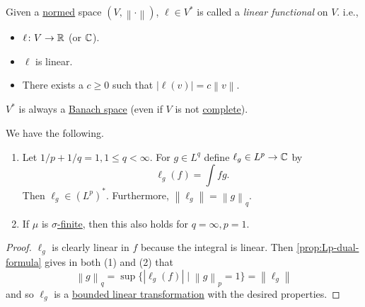 \begin{definition}\label{def:linear-functional}
	Given a \hyperref[def:norm]{normed} space \((V, \left\lVert \cdot\right\rVert )\), \(\ell \in V^\ast\) is called a \emph{linear functional} on \(V\). i.e.,
	\begin{itemize}
		\item \(\ell \colon V \to \mathbb{\MakeUppercase{r}}\) (or \(\mathbb{\MakeUppercase{c}} \)).
		\item \(\ell \) is linear.
		\item There exists a \(c \geq 0\) such that \(\left\vert \ell(v) \right\vert  = c\left\lVert v\right\rVert\).
	\end{itemize}
\end{definition}

\begin{note}
	\(V^\ast\) is always a \hyperref[def:Banach-space]{Banach space} (even if \(V\) is not \hyperref[def:complete]{complete}).
\end{note}

\begin{corollary}\label{col:lp-lq-isometric}
	We have the following.
	\begin{enumerate}[(1)]
		\item Let \(1/p + 1/q = 1, 1 \leq q < \infty\). For \(g \in L^q\) define \(\ell_g \in L^p \to \mathbb{\MakeUppercase{c}}\) by
		      \[
			      \ell_g(f) = \int fg.
		      \]
		      Then \(\ell_g \in (L^p)^\ast\). Furthermore, \(\left\lVert \ell_g\right\rVert = \left\lVert g\right\rVert_q\).
		\item If \(\mu\) is \hyperref[def:finite-measure]{\(\sigma \)-finite}, then this also holds for \(q = \infty, p = 1\).
	\end{enumerate}
\end{corollary}
\begin{proof}
	\(\ell_g\) is clearly linear in \(f\) because the integral is linear. Then \autoref{prop:Lp-dual-formula} gives in both (1) and (2) that
	\[
		\left\lVert g\right\rVert_q = \sup\{\left\vert \ell_g(f) \right\vert  \mid \left\lVert g\right\rVert _p = 1 \} = \left\lVert \ell_g\right\rVert
	\]
	and so \(\ell_g\) is a \hyperref[def:bounded-linear-transformation]{bounded linear transformation} with the desired properties.
\end{proof}


